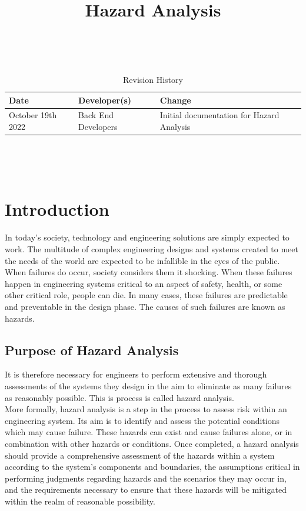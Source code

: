 \documentclass{article}
\title{Hazard Analysis\\\progname}
\author{\authname}
\date{}
\begin{document}
\maketitle
\thispagestyle{empty}

~\newpage


\begin{table}[hp]
	\caption{Revision History} \label{TblRevisionHistory}
	\begin{tabularx}{\textwidth}{llX}
		\toprule
		\textbf{Date} & \textbf{Developer(s)} & \textbf{Change}        \\
		\midrule
		October 19th 2022        & Back End Developers              & Initial documentation for Hazard Analysis \\
		\bottomrule
	\end{tabularx}
\end{table}

~\newpage

\tableofcontents
\listoffigures
\listoftables

~\newpage


\section{Introduction}

In today's society, technology and engineering solutions are simply expected to work. The multitude of complex engineering designs and systems created to meet the needs of the world are expected to be infallible in the eyes of the public. When failures do occur, society considers them it shocking. When these failures happen in engineering systems critical to an aspect of safety, health, or some other critical role, people can die. In many cases, these failures are predictable and preventable in the design phase. The causes of such failures are known as hazards.
\subsection{Purpose of Hazard Analysis}

It is therefore necessary for engineers to perform extensive and thorough assessments of the systems they design in the aim to eliminate as many failures as reasonably possible. This is process is called hazard analysis.\\

More formally, hazard analysis is a step in the process to assess risk within an engineering system. Its aim is to identify and assess the potential conditions which may cause failure. These hazards can exist and cause failures alone, or in combination with other hazards or conditions. Once completed, a hazard analysis should provide a comprehensive assessment of the hazards within a system according to the system's components and boundaries, the assumptions critical in performing judgments regarding hazards and the scenarios they may occur in, and the requirements necessary to ensure that these hazards will be mitigated within the realm of reasonable possibility.
\end{document}
